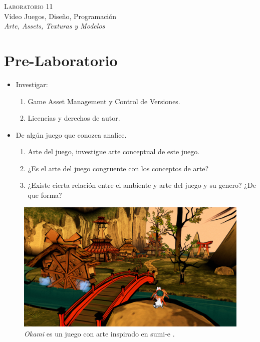 \begin{center}
\textsc{\Large Laboratorio 11}~\\
{\large Vídeo Juegos, Diseño, Programación}~\\
\emph{Arte, Assets, Texturas y Modelos}
\end{center}

\section{Pre-Laboratorio}
\begin{itemize}
\item Investigar:
\begin{enumerate}
  \item Game Asset Management y Control de Versiones.
  \item Licencias y derechos de autor.
\end{enumerate}
\item De algún juego que conozca analice.
\begin{enumerate}
  \item Arte del juego, investigue arte conceptual de este juego.
  \item ¿Es el arte del juego congruente con los conceptos de arte?
  \item ¿Existe cierta relación entre el ambiente y arte del juego y su genero? ¿De que forma?
\end{enumerate}
\end{itemize}

\setlength\intextsep{0pt}
\begin{figure}
\includegraphics[width=\linewidth]{media/okamips2.jpg}
\caption{\emph{Okami} \cite{okami} es un juego con arte inspirado en sumi-e \cite{sumie}.}
\label{fig:particles}
\end{figure}
